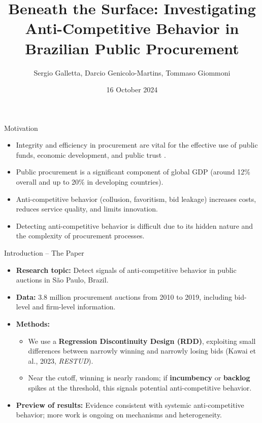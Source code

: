 \documentclass[12pt,english,xcolor=dvipsnames,aspectratio=1610]{beamer}
\title{Beneath the Surface: Investigating Anti-Competitive Behavior in Brazilian Public Procurement}
\author{Sergio Galletta, Darcio Genicolo-Martins, Tommaso Giommoni}
\institute{ETH Zürich \and Insper \and University of Amsterdam}
\date{16 October 2024}
\begin{document}
\begin{frame}
  \titlepage
\end{frame}


\begin{frame}{Motivation}
  \begin{itemize}
    \item Integrity and efficiency in procurement are vital for the effective use of public funds, economic development, and public trust \citep{BosioEtAl2022}.
    \item Public procurement is a significant component of global GDP (around 12\% overall and up to 20\% in developing countries).
    \item Anti-competitive behavior (collusion, favoritism, bid leakage) increases costs, reduces service quality, and limits innovation.
    \item Detecting anti-competitive behavior is difficult due to its hidden nature and the complexity of procurement processes.
  \end{itemize}
\end{frame}

\begin{frame}{Introduction -- The Paper}
\begin{itemize}
  \item \textbf{Research topic:} Detect signals of anti-competitive behavior in public auctions in S\~{a}o Paulo, Brazil. \pause
  \item \textbf{Data:} 3.8 million procurement auctions from 2010 to 2019, including bid-level and firm-level information. \pause
  \item \textbf{Methods:}
    \begin{itemize}
      \item We use a \textbf{Regression Discontinuity Design (RDD)}, exploiting small differences between narrowly winning and narrowly losing bids (Kawai et al., 2023, \emph{RESTUD}).
      \item Near the cutoff, winning is nearly random; if \textbf{incumbency} or \textbf{backlog} spikes at the threshold, this signals potential anti-competitive behavior.
    \end{itemize} \pause
  \item \textbf{Preview of results:} Evidence consistent with systemic anti-competitive behavior; more work is ongoing on mechanisms and heterogeneity.
\end{itemize}
\end{frame}
\end{document}

